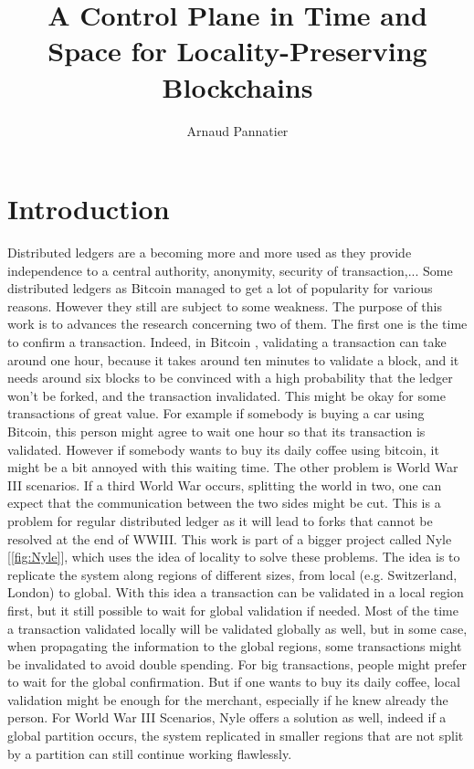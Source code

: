 \documentclass[a4paper,11pt,oneside]{report}
\title{A Control Plane in Time and Space for Locality-Preserving Blockchains}
\author{Arnaud Pannatier}
\begin{document}
\maketitle 

\maketoc

\chapter{Introduction}

Distributed ledgers are a becoming more and more used as they provide
independence to a central authority, anonymity, security of transaction,...
Some distributed ledgers as Bitcoin \cite{Nakamoto2009} managed to get a lot of
popularity for various reasons. However they still are subject to some
weakness. The purpose of this work is to advances the research concerning two
of them. The first one is the time to confirm a transaction. 
Indeed, in Bitcoin \cite{Nakamoto2009}, validating a transaction can take around one
hour, because it takes around ten minutes to validate a block, and it needs
around six blocks to be convinced with a high probability that the ledger won't
be forked, and the transaction invalidated. This might be okay for some
transactions of great value. For example if somebody is buying a car using
Bitcoin, this person might agree to wait one hour so that its transaction is
validated. However if somebody wants to buy its daily coffee using bitcoin, it
might be a bit annoyed with this waiting time. The other problem is World War
III scenarios. If a third World War occurs, splitting the world in two, one can
expect that the communication between the two sides might be cut. This is a
problem for regular distributed ledger as it will lead to forks that cannot be
resolved at the end of WWIII.  This work is part of a bigger project called Nyle
[\autoref{fig:Nyle}], which uses the idea of locality to solve these problems.
The idea is to replicate the system along regions of different sizes, from
local (e.g.  Switzerland, London) to global. With this idea a transaction can
be validated in a local region first, but it still possible to wait for global
validation if needed. Most of the time a transaction validated locally will be
validated globally as well, but in some case, when propagating the information
to the global regions, some transactions might be invalidated to avoid double
spending. For big transactions, people might prefer to wait for the global
confirmation. But if one wants to buy its daily coffee, local validation might
be enough for the merchant, especially if he knew already the person. For
World War III Scenarios, Nyle offers a solution as well, indeed if a global
partition occurs, the system replicated in smaller regions that are not split
by a partition can still continue working flawlessly. 
\end{document}
